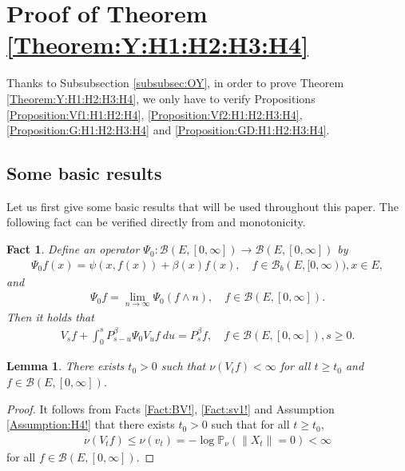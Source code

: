 \documentclass[12pt,a4paper]{amsart}
\numberwithin{equation}{section}
\theoremstyle{plain}
\newtheorem{lem}[thm]{Lemma}
\newtheorem{fact}[thm]{Fact}
\theoremstyle{definition}
\theoremstyle{remark}
\begin{document}
\section{Proof of Theorem \ref{Theorem:Y:H1:H2:H3:H4}}
Thanks to Subsubsection \ref{subsubsec:OY}, in order to prove Theorem \ref{Theorem:Y:H1:H2:H3:H4}, we only have to verify Propositions \ref{Proposition:Vf1:H1:H2:H4}, \ref{Proposition:Vf2:H1:H2:H3:H4}, \ref{Proposition:G:H1:H2:H3:H4} and \ref{Proposition:GD:H1:H2:H3:H4}.
\subsection{Some basic results}
Let us first give some basic results that will be used throughout this paper.
The following fact can be verified directly from \cite[Theorem 2.23]{Li2011MeasureValued} and monotonicity.
\begin{fact} \label{Fact:P!}
Define an operator $\Psi_0: \mathcal B(E, [0,\infty]) \to \mathcal B(E,[0,\infty])$ by
\begin{align}
 \Psi_0 f(x)
 = \psi(x,f(x))+\beta(x)f(x),
 \quad f\in \mathcal B_b(E,[0,\infty)), x\in E,
 \end{align}
and
\begin{align}
 \Psi_0 f
 = \lim_{n\to \infty} \Psi_0 (f\wedge n), \quad f\in \mathcal B(E,[0,\infty]).
 \end{align}
Then it holds that
\begin{align}\label{e:cum-FK}
 V_s f + \int_0^s P_{s-u}^\beta \Psi_0 V_{u} f ~du
 = P_s^\beta f,
 \quad f\in \mathcal B(E,[0,\infty]), s\geq 0.
 \end{align}
\end{fact}
\begin{lem} \label{Lemma:nV:H4}
There exists $t_0>0$ such that $\nu(V_tf) < \infty$ for all $t\ge t_0$ and $f\in \mathcal B(E, [0,\infty])$.
\end{lem}
\begin{proof}
It follows from Facts \ref{Fact:BV!}, \ref{Fact:sv1!} and Assumption \ref{Assumption:H4!} that
there exists $t_0>0$ such that for  all $t\ge t_0$,
\begin{align}
 \nu(V_t f) \leq \nu(v_t)
 = - \log \mathbb P_\nu (\|X_t\| = 0)
 < \infty
 \end{align}
for all $f\in \mathcal B(E,[0,\infty])$.
\end{proof}
\end{document}
